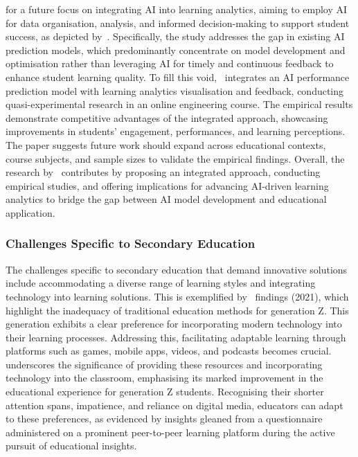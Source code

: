 \citet{Ouyang2023} for a future focus on integrating AI into learning analytics, aiming to employ AI for data organisation, analysis, and informed decision-making to support student success, as depicted by~\citet{Pelletier2022}. Specifically, the study addresses the gap in existing AI prediction models, which predominantly concentrate on model development and optimisation rather than leveraging AI for timely and continuous feedback to enhance student learning quality. To fill this void,~\citet{Ouyang2023} integrates an AI performance prediction model with learning analytics visualisation and feedback, conducting quasi-experimental research in an online engineering course. The empirical results demonstrate competitive advantages of the integrated approach, showcasing improvements in students' engagement, performances, and learning perceptions. The paper suggests future work should expand across educational contexts, course subjects, and sample sizes to validate the empirical findings. Overall, the research by~\citet{Ouyang2023} contributes by proposing an integrated approach, conducting empirical studies, and offering implications for advancing AI-driven learning analytics to bridge the gap between AI model development and educational application.

\subsubsection{Challenges Specific to Secondary Education} 
The challenges specific to secondary education that demand innovative solutions include accommodating a diverse range of learning styles and integrating technology into learning solutions. This is exemplified by~\citet{Szymkowiak2021} findings (2021), which highlight the inadequacy of traditional education methods for generation Z. This generation exhibits a clear preference for incorporating modern technology into their learning processes. Addressing this, facilitating adaptable learning through platforms such as games, mobile apps, videos, and podcasts becomes crucial.~\citet{Szymkowiak2021} underscores the significance of providing these resources and incorporating technology into the classroom, emphasising its marked improvement in the educational experience for generation Z students. Recognising their shorter attention spans, impatience, and reliance on digital media, educators can adapt to these preferences, as evidenced by insights gleaned from a questionnaire administered on a prominent peer-to-peer learning platform during the active pursuit of educational insights.

